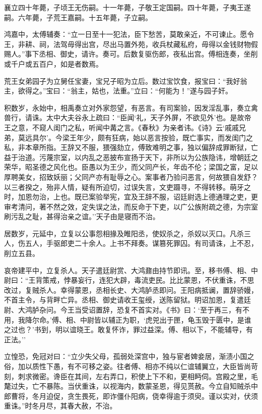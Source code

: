 \documentclass[]{article}
\begin{document}
襄立四十年薨，子顷王无伤嗣。十一年薨，子敬王定国嗣。四十年薨，子夷王遂嗣。六年薨，子荒王嘉嗣。十五年薨，子立嗣。

鸿嘉中，太傅辅奏：``立一日至十一犯法，臣下愁苦，莫敢亲近，不可谏止。愿令王，非耕、祠，法驾毋得出宫，尽出马置外苑，收兵杖藏私府，毋得以金钱财物假赐人。''事下丞相、御史，请许。奏可。后数复驱伤郎，夜私出宫。傅相连奏，坐削或千户或五百户，如是者数焉。

荒王女弟园子为立舅任宝妻，宝兄子昭为立后。数过宝饮食，报宝曰：``我好翁主，欲得之。''宝曰：``翁主，姑也，法重。''立曰：``何能为！''遂与园子奸。

积数岁，永始中，相禹奏立对外家怨望，有恶言。有司案验，因发淫乱事，奏立禽兽行，请诛。太中大夫谷永上疏曰：``臣闻`礼，天子外屏，不欲见外'也。是故帝王之意，不窥人闺门之私，听闻中冓之言。《春秋》为亲者讳。《诗》云`戚戚兄弟，莫远具尔'。今梁王年少，颇有狂病，始以恶言按验，既亡事实，而发闺门之私，非本章所指。王辞又不服，猥强劾立，傅致难明之事，独以偏辞成罪断狱，亡益于治道。污蔑宗室，以内乱之恶披布宣扬于天下，非所以为公族隐讳，增朝廷之荣华，昭圣德之风化也。臣愚以为王少，而父同产长，年齿不伦；梁国之富，足以厚聘美女，招致妖丽；父同产亦有耻辱之心。案事者乃验问恶言，何故猥自发舒？以三者揆之，殆非人情，疑有所迫切，过误失言，文吏蹑寻，不得转移。萌牙之时，加恩勿治，上也。既已案验举宪，宜及王辞不服，诏廷尉选上德通理之吏，更审考清问，著不然之效，定失误之法，而反命于下吏，以广公族附疏之德，为宗室刷污乱之耻，甚得治亲之谊。''天子由是寝而不治。

居数岁，元延中，立复以公事怨相掾及睢阳丞，使奴杀之，杀奴以灭口。凡杀三人，伤五人，手驱郎吏二十余人。上书不拜奏。谋篡死罪囚。有司请诛，上不忍，削立五县。

哀帝建平中，立复杀人。天子遣廷尉赏、大鸿鼐由持节即讯。至，移书傅、相、中尉曰：``王背策戒，悖暴妄行，连犯大辟，毒流吏民。比比蒙恩，不伏重诛，不思改过，复贼杀人。幸得蒙恩，丞相长史、大鸿胪丞即问。王阳病抵谰，置辞骄嫚，不首主令，与背畔亡异。丞相、御史请收王玺绶，送陈留狱。明诏加恩，复遣廷尉、大鸿胪杂问。今王当受诏置辞，恐复不首实对。《书》曰：`至于再三，有不用，我降尔命。'傅、相、中尉皆以辅正为职，`虎兕出于匣，龟玉毁于匮中，是谁之过也？'书到，明以谊晓王。敢复怀诈，罪过益深。傅、相以下，不能辅导，有正法。''

立惶恐，免冠对曰：``立少失父母，孤弱处深宫中，独与宦者婢妾居，渐渍小国之俗，加以质性下愚，有不可移之姿。往者傅、相亦不纯以仁谊辅翼立，大臣皆尚苛刻，刺求微密。谗臣在其间，左右弄口，积使上下不和，更相眄伺。宫殿之里，毛氂过失，亡不暴陈。当伏重诛，以视海内，数蒙圣恩，得见贳赦。今立自知贼杀中郎曹将，冬月迫促，贪生畏死，即诈僵仆阳病，侥幸得逾于须臾。谨以实对，伏须重诛。''时冬月尽，其春大赦，不治。
\end{document}
